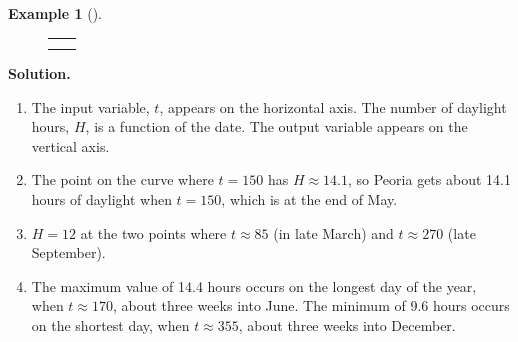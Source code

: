 \documentclass[10pt,]{book}
\theoremstyle{plain}
\theoremstyle{definition}
\theoremstyle{definition}
\newtheorem{example}[theorem]{Example}
\theoremstyle{definition}
\theoremstyle{definition}
\numberwithin{equation}{part}
\newlength{\panelmax}
\begin{document}
\begin{example}[]
{{}
\newlength{\phAVimage}\setlength{\phAVimage}{\ht\panelboxAVimage+\dp\panelboxAVimage}
\settototalheight{\phAVimage}{\usebox{\panelboxAVimage}}
\setlength{\panelmax}{\maxof{\panelmax}{\phAVimage}}
\leavevmode%
\setlength{\tabcolsep}{0\textwidth}
\begin{figure}
\begin{tabular}{@{}*{2}{c}@{}}
\begin{minipage}[c][\panelmax][t]{0.5\textwidth}\usebox{\panelboxAparagraphs}\end{minipage}&
\begin{minipage}[c][\panelmax][t]{0.5\textwidth}\usebox{\panelboxAVimage}\end{minipage}\tabularnewline
&
\parbox[t]{0.5\textwidth}{
}\end{tabular}
\end{figure}
}%
\par\medskip\noindent%
\textbf{Solution.}\quad \leavevmode%
\begin{enumerate}[label=\alph*]
\item\hypertarget{li-277}{}The input variable, \(t\), appears on the horizontal axis. The number of daylight hours, \(H\), is a function of the date. The output variable appears on the vertical axis.%
\item\hypertarget{li-278}{}The point on the curve where \(t = 150\) has \(H \approx 14.1\), so Peoria gets about 14.1 hours of daylight when \(t = 150\), which is at the end of May.%
\item\hypertarget{li-279}{}\(H = 12\) at the two points where \(t \approx 85\) (in late March) and \(t \approx 270\) (late September).%
\item\hypertarget{li-280}{}The maximum value of 14.4 hours occurs on the longest day of the year, when \(t \approx 170\), about three weeks into June. The minimum of 9.6 hours occurs on the shortest day, when \(t \approx 355\), about three weeks into December.%
\end{enumerate}
\end{example}
\end{document}
